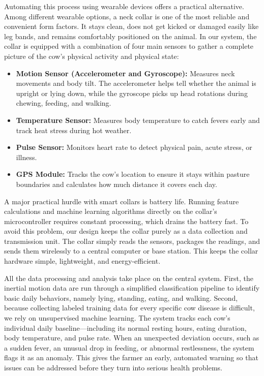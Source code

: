 \documentclass[conference]{IEEEtran}
\begin{document}
Automating this process using wearable devices offers a practical alternative. Among different wearable options, a neck collar is one of the most reliable and convenient form factors. It stays clean, does not get kicked or damaged easily like leg bands, and remains comfortably positioned on the animal. In our system, the collar is equipped with a combination of four main sensors to gather a complete picture of the cow's physical activity and physical state:
\begin{itemize}
    \item \textbf{Motion Sensor (Accelerometer and Gyroscope):} Measures neck movements and body tilt. The accelerometer helps tell whether the animal is upright or lying down, while the gyroscope picks up head rotations during chewing, feeding, and walking.
    \item \textbf{Temperature Sensor:} Measures body temperature to catch fevers early and track heat stress during hot weather.
    \item \textbf{Pulse Sensor:} Monitors heart rate to detect physical pain, acute stress, or illness.
    \item \textbf{GPS Module:} Tracks the cow's location to ensure it stays within pasture boundaries and calculates how much distance it covers each day.
\end{itemize}

A major practical hurdle with smart collars is battery life. Running feature calculations and machine learning algorithms directly on the collar's microcontroller requires constant processing, which drains the battery fast. To avoid this problem, our design keeps the collar purely as a data collection and transmission unit. The collar simply reads the sensors, packages the readings, and sends them wirelessly to a central computer or base station. This keeps the collar hardware simple, lightweight, and energy-efficient.

All the data processing and analysis take place on the central system. First, the inertial motion data are run through a simplified classification pipeline to identify basic daily behaviors, namely lying, standing, eating, and walking. Second, because collecting labeled training data for every specific cow disease is difficult, we rely on unsupervised machine learning. The system tracks each cow's individual daily baseline—including its normal resting hours, eating duration, body temperature, and pulse rate. When an unexpected deviation occurs, such as a sudden fever, an unusual drop in feeding, or abnormal restlessness, the system flags it as an anomaly. This gives the farmer an early, automated warning so that issues can be addressed before they turn into serious health problems.
\end{document}

